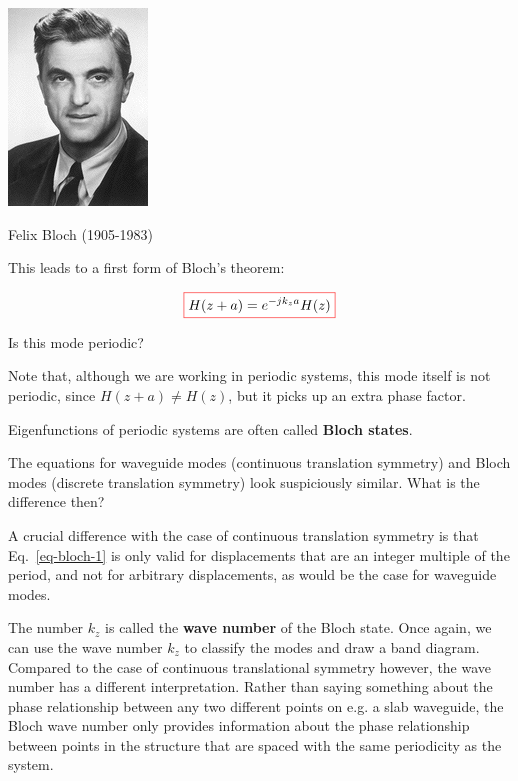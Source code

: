 \begin{marginfigure}[0.5cm]
  \includegraphics{symmetry/figures/bloch}
  \caption{Felix Bloch (1905-1983)}
\end{marginfigure}

This leads to a first form of Bloch's theorem:

\begin{equation}
\fbox{$\displaystyle  
  H(z + a) = e^{-j k_z a} H(z) \label{eq-bloch-1}
  $}
\end{equation} 

\begin{cue}
Is this mode periodic?
\end{cue}

Note that, although we are working in periodic systems, this mode itself is not periodic, since $H(z + a) \ne H(z)$, but it picks up an extra phase factor.

Eigenfunctions of periodic systems are often called \textbf{Bloch states}.

\begin{cue}
  The equations for waveguide modes (continuous translation symmetry) and Bloch modes (discrete translation symmetry) look suspiciously similar. What is the difference then?
\end{cue}

A crucial difference with the case of continuous translation symmetry is that Eq.~\ref{eq-bloch-1} is only valid for displacements that are an integer multiple of the period, and not for arbitrary displacements, as would be the case for waveguide modes.
 
The number $k_z$ is called the \textbf{wave number} of the Bloch state. Once again, we can use the wave number $k_z$ to classify the modes and draw a band diagram. Compared to the case of continuous translational symmetry however, the wave number has a different interpretation. Rather than saying something about the phase relationship between any two different points on e.g. a slab waveguide, the Bloch wave number only provides information about the phase relationship between points in the structure that are spaced with the same periodicity as the system.


